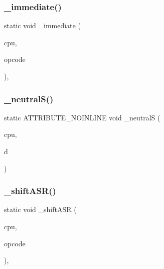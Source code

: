 \mbox{\label{isa-arm_8c_a5948ab4e0f82eb11d17504a8cc5237b7}} 
\subsubsection{\texorpdfstring{\+\_\+immediate()}{\_immediate()}}
{\footnotesize\ttfamily static void \+\_\+immediate (\begin{DoxyParamCaption}\item[{struct A\+R\+M\+Core $\ast$}]{cpu,  }\item[{uint32\+\_\+t}]{opcode }\end{DoxyParamCaption})\hspace{0.3cm}{\ttfamily [inline]}, {\ttfamily [static]}}

\mbox{\label{isa-arm_8c_a773c46d6cc7e0b7b6d527138482874df}} 
\subsubsection{\texorpdfstring{\+\_\+neutral\+S()}{\_neutralS()}}
{\footnotesize\ttfamily static A\+T\+T\+R\+I\+B\+U\+T\+E\+\_\+\+N\+O\+I\+N\+L\+I\+NE void \+\_\+neutralS (\begin{DoxyParamCaption}\item[{struct A\+R\+M\+Core $\ast$}]{cpu,  }\item[{int32\+\_\+t}]{d }\end{DoxyParamCaption})\hspace{0.3cm}{\ttfamily [static]}}

\mbox{\label{isa-arm_8c_aedec32cf3d293a334f38a37b00eaeb06}} 
\subsubsection{\texorpdfstring{\+\_\+shift\+A\+S\+R()}{\_shiftASR()}}
{\footnotesize\ttfamily static void \+\_\+shift\+A\+SR (\begin{DoxyParamCaption}\item[{struct A\+R\+M\+Core $\ast$}]{cpu,  }\item[{uint32\+\_\+t}]{opcode }\end{DoxyParamCaption})\hspace{0.3cm}{\ttfamily [inline]}, {\ttfamily [static]}}

